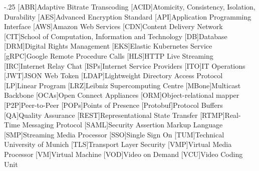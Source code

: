 \documentclass[headsepline,footsepline,footinclude=false,oneside,fontsize=11pt,paper=a4,listof=totoc,bibliography=totoc]{scrbook} %
\begin{document}


\frontmatter{}





\tableofcontents{}

\mainmatter{}






%





\appendix{}


\begin{acronym}
	\itemsep-.25\baselineskip
    [ABR]{Adaptive Bitrate Transcoding}
    [ACID]{Atomicity, Consistency, Isolation, Durability}
    [AES]{Advanced Encryption Standard}
    [API]{Application Programming Interface}
    [AWS]{Amazon Web Services}
    [CDN]{Content Delivery Network}
    [CIT]{School of Computation, Information and Technology}
    [DB]{Database}
    [DRM]{Digital Rights Management}
    [EKS]{Elastic Kubernetes Service}
    [gRPC]{Google Remote Procedure Calls}
    [HLS]{HTTP Live Streaming}
    [IRC]{Internet Relay Chat}
    [ISPs]{Internet Service Providers}
    [ITO]{IT Operations}
    [JWT]{JSON Web Token}
    [LDAP]{Lightweight Directory Access Protocol}
    [LP]{Linear Program}
    [LRZ]{Leibniz Supercomputing Centre}
    [MBone]{Multicast Backbone}
    [OCAs]{Open Connect Appliances}
    [ORM]{Object-relational mapper}
    [P2P]{Peer-to-Peer}
    [POPs]{Points of Presence}
    [Protobuf]{Protocol Buffers}
    [QA]{Quality Assurance}
    [REST]{Representational State Transfer}
    [RTMP]{Real-Time Messaging Protocol}
    [SAML]{Security Assertion Markup Language}
    [SMP]{Streaming Media Processor}
    [SSO]{Single Sign On}
    [TUM]{Technical University of Munich}
    [TLS]{Transport Layer Security}
    [VMP]{Virtual Media Processor}
    [VM]{Virtual Machine}
    [VOD]{Video on Demand}
    [VCU]{Video Coding Unit}
    
\end{acronym}

\listoffigures{}
\listoftables{}
\printbibliography{}
\end{document}
